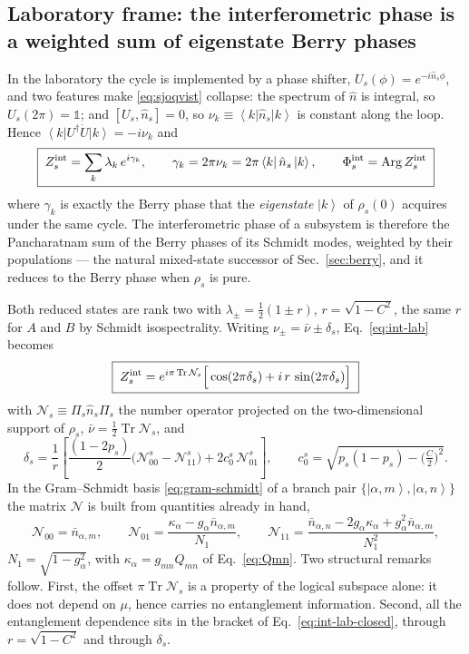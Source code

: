 \documentclass[11pt]{article}
\newcommand{\ket}[1]{\left|#1\right\rangle}
\newcommand{\bra}[1]{\left\langle#1\right|}
\newcommand{\Tr}{\operatorname{Tr}}
\newcommand{\Arg}{\operatorname{Arg}}
\newcommand{\nop}{\hat n}
\begin{document}
\subsection{Laboratory frame: the interferometric phase is a weighted sum of
eigenstate Berry phases}

In the laboratory the cycle is implemented by a phase shifter,
$U_s(\phi)=e^{-i\nop_s\phi}$, and two features make \eqref{eq:sjoqvist}
collapse: the spectrum of $\nop$ is integral, so $U_s(2\pi)=\mathbb 1$; and
$[U_s,\nop_s]=0$, so $\nu_k\equiv\bra{k}\nop_s\ket{k}$ is constant along the
loop. Hence $\bra{k}U^\dagger\dot U\ket{k}=-i\nu_k$ and
\begin{equation}
\boxed{\;Z^{\rm int}_s=\sum_k\lambda_k\,e^{i\gamma_k},\qquad
\gamma_k=2\pi\nu_k=2\pi\bra{k}\nop_s\ket{k},\qquad
\Phi^{\rm int}_s=\Arg Z^{\rm int}_s\;}
\label{eq:int-lab}
\end{equation}
where $\gamma_k$ is exactly the Berry phase that the \emph{eigenstate}
$\ket{k}$ of $\rho_s(0)$ acquires under the same cycle. The interferometric
phase of a subsystem is therefore the Pancharatnam sum of the Berry phases of
its Schmidt modes, weighted by their populations --- the natural mixed-state
successor of Sec.~\ref{sec:berry}, and it reduces to the Berry phase when
$\rho_s$ is pure.

Both reduced states are rank two with
$\lambda_\pm=\tfrac12(1\pm r)$, $r=\sqrt{1-C^2}$, the same $r$ for $A$ and $B$
by Schmidt isospectrality. Writing $\nu_\pm=\bar\nu\pm\delta_s$,
Eq.~\eqref{eq:int-lab} becomes
\begin{equation}
\boxed{\;
Z^{\rm int}_s=e^{i\pi\Tr\mathcal N_s}
\Big[\cos(2\pi\delta_s)+i\,r\,\sin(2\pi\delta_s)\Big]\;}
\label{eq:int-lab-closed}
\end{equation}
with $\mathcal N_s\equiv \Pi_s\nop_s\Pi_s$ the number operator projected on the
two-dimensional support of $\rho_s$, $\bar\nu=\tfrac12\Tr\mathcal N_s$, and
\begin{equation}
\delta_s=\frac{1}{r}\left[\frac{(1-2p_s)}{2}
\big(\mathcal N^s_{00}-\mathcal N^s_{11}\big)
+2c_0^s\,\mathcal N^s_{01}\right],\qquad
c_0^s=\sqrt{p_s(1-p_s)-\big(\tfrac{C}{2}\big)^2}.
\label{eq:delta-s}
\end{equation}
In the Gram--Schmidt basis \eqref{eq:gram-schmidt} of a branch pair
$\{\ket{\alpha,m},\ket{\alpha,n}\}$ the matrix $\mathcal N$ is built from
quantities already in hand,
\begin{equation}
\mathcal N_{00}=\bar n_{\alpha,m},\qquad
\mathcal N_{01}=\frac{\kappa_\alpha-g_\alpha\bar n_{\alpha,m}}{N_1},\qquad
\mathcal N_{11}=\frac{\bar n_{\alpha,n}-2g_\alpha\kappa_\alpha
+g_\alpha^2\bar n_{\alpha,m}}{N_1^2},
\label{eq:Nmatrix}
\end{equation}
$N_1=\sqrt{1-g_\alpha^2}$, with $\kappa_\alpha=g_{mn}Q_{mn}$ of
Eq.~\eqref{eq:Qmn}. Two structural remarks follow. First, the offset
$\pi\Tr\mathcal N_s$ is a property of the logical subspace alone: it does not
depend on $\mu$, hence carries no entanglement information. Second, all the
entanglement dependence sits in the bracket of
Eq.~\eqref{eq:int-lab-closed}, through $r=\sqrt{1-C^2}$ and through
$\delta_s$.
\end{document}
